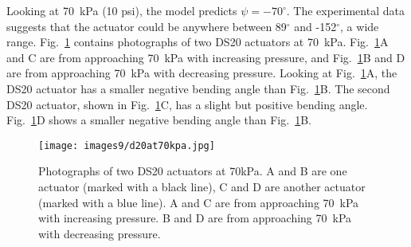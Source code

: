 Looking at 70~kPa (10 psi), the model predicts $\psi=-70^\circ$. The experimental data suggests that the actuator could be anywhere between 89$^\circ$ and -152$^\circ$, a wide range. Fig.~\ref{fig:d20at70kpa} contains photographs of two DS20 actuators at 70~kPa. Fig.~\ref{fig:d20at70kpa}A and C are from approaching 70~kPa with increasing pressure, and Fig.~\ref{fig:d20at70kpa}B and D are from approaching 70~kPa with decreasing pressure. Looking at Fig.~\ref{fig:d20at70kpa}A, the DS20 actuator has a smaller negative bending angle than Fig.~\ref{fig:d20at70kpa}B. The second DS20 actuator, shown in Fig.~\ref{fig:d20at70kpa}C, has a slight but positive bending angle. Fig.~\ref{fig:d20at70kpa}D shows a smaller negative bending angle than Fig.~\ref{fig:d20at70kpa}B. 
\\
\begin{figure}[ht]
    \centering
     \texttt{[image: images9/d20at70kpa.jpg]}
    \caption{Photographs of two DS20 actuators at 70kPa. A and B are one actuator (marked with a black line), C and D are another actuator (marked with a blue line). A and C are from approaching 70~kPa with increasing pressure. B and D are from approaching 70~kPa with decreasing pressure.}
    \label{fig:d20at70kpa}
\end{figure}

